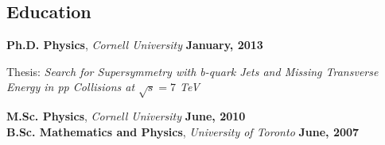 \documentclass[margin,line]{res}
\newenvironment{list1}{
  \begin{list}{\ding{113}}{%
      \setlength{\itemsep}{0in}
      \setlength{\parsep}{0in} \setlength{\parskip}{0in}
      \setlength{\topsep}{0in} \setlength{\partopsep}{0in}
      \setlength{\leftmargin}{0.17in}}}{\end{list}}
\newenvironment{list2}{
  \begin{list}{$\bullet$}{%
      \setlength{\itemsep}{0in}
      \setlength{\parsep}{0in} \setlength{\parskip}{0in}
      \setlength{\topsep}{0in} \setlength{\partopsep}{0in}
      \setlength{\leftmargin}{0.2in}}}{\end{list}}
\begin{document}
\begin{resume}
\section{\sc Education}
{\bf Ph.D. Physics}, \textit{Cornell University} \hfill {\bf January, 2013}\\
\vspace*{-.1in}
\begin{list1}
\item[] Thesis: \textit{Search for Supersymmetry with b-quark Jets and Missing
\newline \hspace*{10.5 mm} Transverse Energy in pp Collisions at $\sqrt{s}=7$ TeV}
\end{list1}
\vspace{-.1in}
{\bf M.Sc. Physics}, \textit{Cornell University} \hfill {\bf June, 2010}\\
{\bf B.Sc. Mathematics and Physics}, \textit{University of Toronto} \hfill {\bf June, 2007}\\
\vspace*{-.1in}
\vspace{-.3cm}

\end{resume}
\end{document}
